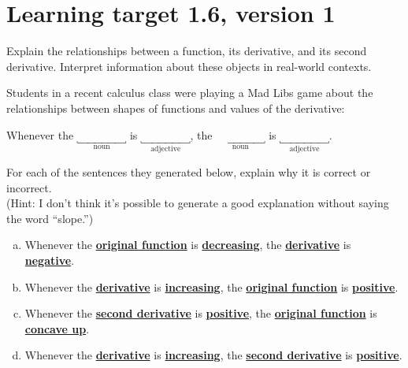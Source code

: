 



\section{Learning target 1.6, version 1}

Explain the relationships between a function, its derivative, and its second derivative. Interpret information about these objects in real-world contexts.

\hrulefill

Students in a recent calculus class were playing a Mad Libs game about the relationships between shapes of functions and values of the derivative:

\vspace{0.5em}
\begin{center}
    Whenever the 
    $\underbracket{\phantom{derivative}}_\text{noun}$ is
    $\underbracket{\phantom{derivative}}_\text{adjective}$,
    the 
    $\underbracket{\phantom{derivative}}_\text{noun}$ is
    $\underbracket{\phantom{derivative}}_\text{adjective}$.
\end{center}
\vspace{0.5em}

For each of the sentences they generated below, explain why it is correct or incorrect. \\
(Hint: I don't think it's possible to generate a good explanation without saying the word ``slope.'')

\begin{enumerate}[(a)]
    \item Whenever the 
    \underline{\textbf{original function}} is
    \underline{\textbf{decreasing}}, the
    \underline{\textbf{derivative}} is
    \underline{\textbf{negative}}.

    \vfill
    \item Whenever the 
    \underline{\textbf{derivative}} is
    \underline{\textbf{increasing}}, the
    \underline{\textbf{original function}} is
    \underline{\textbf{positive}}.

    \vfill
    \item Whenever the 
    \underline{\textbf{second derivative}} is
    \underline{\textbf{positive}}, the
    \underline{\textbf{original function}} is
    \underline{\textbf{concave up}}.

    \vfill
    \item Whenever the 
    \underline{\textbf{derivative}} is
    \underline{\textbf{increasing}}, the
    \underline{\textbf{second derivative}} is
    \underline{\textbf{positive}}.

    \vfill
\end{enumerate}
\vspace{-3em}


